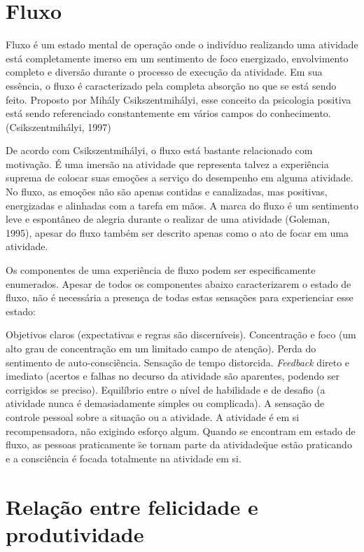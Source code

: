\chapter{Fluxo}

Fluxo é um estado mental de operação onde o indivíduo realizando uma atividade está completamente imerso em um sentimento de foco energizado, envolvimento completo e diversão durante o processo de execução da atividade. Em sua essência, o fluxo é caracterizado pela completa absorção no que se está sendo feito. Proposto por Mihály Csikszentmihályi, esse conceito da psicologia positiva está sendo referenciado constantemente em vários campos do conhecimento. (Csikszentmihályi, 1997)

De acordo com Csikszentmihályi, o fluxo está bastante relacionado com motivação. É uma imersão na atividade que representa talvez a experiência suprema de colocar suas emoções a serviço do desempenho em alguma atividade. No fluxo, as emoções não são apenas contidas e canalizadas, mas positivas, energizadas e alinhadas com a tarefa em mãos. A marca do fluxo é um sentimento leve e espontâneo de alegria durante o realizar de uma atividade (Goleman, 1995), apesar do fluxo também ser descrito apenas como o ato de focar em uma atividade.

Os componentes de uma experiência de fluxo podem ser especificamente enumerados. Apesar de todos os componentes abaixo caracterizarem o estado de fluxo, não é necessária a presença de todas estas sensações para experienciar esse estado:

Objetivos claros (expectativas e regras são discerníveis).
Concentração e foco (um alto grau de concentração em um limitado campo de atenção).
Perda do sentimento de auto-consciência.
Sensação de tempo distorcida.
\emph{Feedback} direto e imediato (acertos e falhas no decurso da atividade são aparentes, podendo ser corrigidos se preciso).
Equilíbrio entre o nível de habilidade e de desafio (a atividade nunca é demasiadamente simples ou complicada).
A sensação de controle pessoal sobre a situação ou a atividade.
A atividade é em si recompensadora, não exigindo esforço algum.
Quando se encontram em estado de fluxo, as pessoas praticamente \"se tornam parte da atividade\" que estão praticando e a consciência é focada totalmente na atividade em si.

\chapter{Relação entre felicidade e produtividade}

